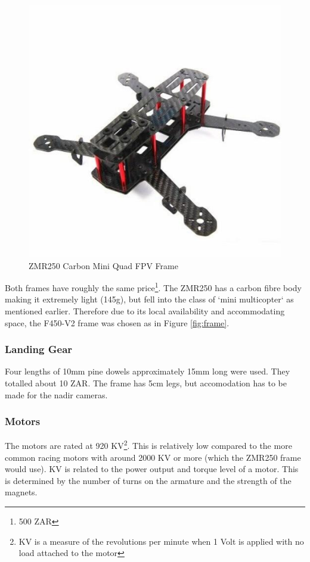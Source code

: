 \begin{figure}[H]
\centering
\includegraphics[scale=0.35]{images/zmr250.jpeg}
\caption{ZMR250 Carbon Mini Quad FPV Frame \cite{frobot}}
\label{fig:zmr}
\end{figure}

Both frames have roughly the same price\footnote{500 ZAR}. The ZMR250 has a carbon fibre body making it extremely light (145g), but fell into the class of `mini multicopter` as mentioned earlier. Therefore due to its local availability and accommodating space, the F450-V2 frame was chosen as in Figure \ref{fig:frame}.

\subsubsection{Landing Gear}

Four lengths of 10mm pine dowels approximately 15mm long were used. They totalled about 10 ZAR. The frame has 5cm legs, but accomodation has to be made for the nadir cameras.

\subsubsection{Motors}

The motors are rated at 920 KV\footnote{KV is a measure of the revolutions per minute when 1 Volt is applied with no load attached to the motor}. This is relatively low compared to the more common racing motors with around 2000 KV or more (which the ZMR250 frame would use). KV is related to the power output and torque level of a motor. This is determined by the number of turns on the armature and the strength of the magnets.\\

